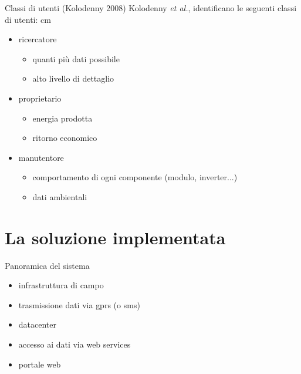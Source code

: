 \documentclass{beamer}
\newcommand{\N}{\vskip 0.3 cm}
\newcommand{\red}[1]{\textcolor[rgb]{.8,0,0}{#1}}
\newcommand{\green}[1]{\textcolor[rgb]{0,.6,.1}{#1}}
\begin{document}
%
\begin{frame}{Classi di utenti (Kolodenny 2008)}
Kolodenny \emph{et al.}, identificano le seguenti \green{classi di utenti}:
\N
%
\begin{itemize}
\item \red{ricercatore}
  \begin{itemize}
  \item quanti pi\`u dati possibile
  \item alto livello di dettaglio
  \end{itemize}
\item \red{proprietario}
  \begin{itemize}
  \item energia prodotta
  \item ritorno economico
  \end{itemize}
\item \red{manutentore}
  \begin{itemize}
  \item comportamento di ogni componente (modulo, inverter...)
  \item dati ambientali
  \end{itemize}
\end{itemize}
%
\end{frame}
%

%
\section{La soluzione implementata}
\begin{frame}{Panoramica del sistema}
%
\begin{figure}[!h]
  \begin{center}
  \end{center}
\end{figure}
%
\begin{itemize}
\item infrastruttura \red{di campo}
\item trasmissione dati via \red{gprs} (o \red{sms})
\item \red{datacenter}
\item accesso ai dati via \red{web services}
\item portale web
\end{itemize}
%
\end{frame}
%
\end{document}
